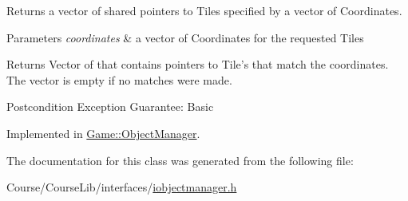 Returns a vector of shared pointers to Tiles specified by a vector of Coordinates. 


\begin{DoxyParams}{Parameters}
{\em coordinates} & a vector of Coordinates for the requested Tiles \\
\hline
\end{DoxyParams}
\begin{DoxyReturn}{Returns}
Vector of that contains pointers to Tile's that match the coordinates. The vector is empty if no matches were made. 
\end{DoxyReturn}
\begin{DoxyPostcond}{Postcondition}
Exception Guarantee\-: Basic 
\end{DoxyPostcond}


Implemented in \hyperlink{classGame_1_1ObjectManager_ad4646477bd85b931f028a1a8f5916f3e}{Game\-::\-Object\-Manager}.



The documentation for this class was generated from the following file\-:\begin{DoxyCompactItemize}
\item 
Course/\-Course\-Lib/interfaces/\hyperlink{iobjectmanager_8h}{iobjectmanager.\-h}\end{DoxyCompactItemize}
